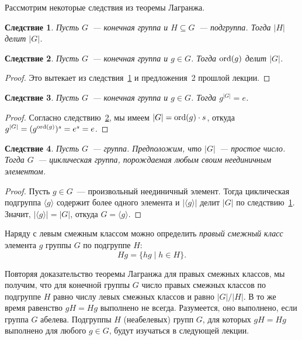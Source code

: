\documentclass[a4paper,10pt]{amsart}
\def\ord{{\rm ord}}%
\def\ord{{\rm ord}}
\def\ord{{\rm ord}}
\newtheorem{corollary}{Следствие}
\theoremstyle{definition}
\theoremstyle{remark}
\begin{document}
\medskip

Рассмотрим некоторые следствия из теоремы Лагранжа.

\begin{corollary} \label{c1}
Пусть $G$~--- конечная группа и $H\subseteq G$~--- подгруппа. Тогда
$|H|$ делит $|G|$.
\end{corollary}

\begin{corollary} \label{c2}
Пусть $G$~--- конечная группа и $g\in G$. Тогда $\ord(g)$ делит
$|G|$.
\end{corollary}

\begin{proof}
Это вытекает из следствия~\ref{c1} и предложения~2 прошлой лекции.
\end{proof}

\begin{corollary} \label{c3}
Пусть $G$~--- конечная группа и $g\in G$. Тогда $g^{|G|}=e$.
\end{corollary}

\begin{proof}
Согласно следствию~\ref{c2}, мы имеем $|G|=\ord(g) \cdot s$, откуда
$g^{|G|}=(g^{\ord(g)})^s=e^s=e$.
\end{proof}

\begin{corollary} \label{c5}
Пусть $G$~--- группа. Предположим, что $|G|$~--- простое число.
Тогда $G$~--- циклическая группа, порождаемая любым своим
неединичным элементом.
\end{corollary}

\begin{proof}
Пусть $g\in G$~--- произвольный неединичный элемент. Тогда
циклическая подгруппа $\langle g\rangle$ содержит более одного
элемента и $|\langle g\rangle|$ делит $|G|$ по следствию~\ref{c1}.
Значит, $|\langle g\rangle|=|G|$, откуда $G=\langle g\rangle$.
\end{proof}

Наряду с левым смежным классом можно определить {\it правый смежный
класс} элемента $g$ группы $G$ по подгруппе $H$:
$$
Hg=\{hg \mid h\in H\}.
$$

Повторяя доказательство теоремы Лагранжа для правых смежных классов,
мы получим, что для конечной группы $G$ число правых смежных классов
по подгруппе $H$ равно числу левых смежных классов и равно
$|G|/|H|$. В то же время равенство $gH=Hg$ выполнено не всегда.
Разумеется, оно выполнено, если группа $G$ абелева. Подгруппы $H$
(неабелевых) групп $G$, для которых $gH=Hg$ выполнено для любого
$g\in G$, будут изучаться в следующей лекции.
\end{document}
